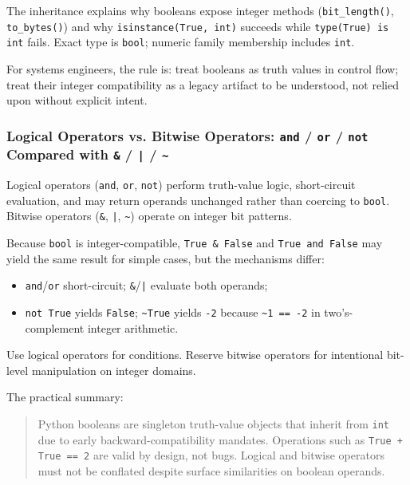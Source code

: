 The inheritance explains why booleans expose integer methods (\texttt{bit\_length()}, \texttt{to\_bytes()}) and why \texttt{isinstance(True, int)} succeeds while \texttt{type(True) is int} fails. Exact type is \texttt{bool}; numeric family membership includes \texttt{int}.

For systems engineers, the rule is: treat booleans as truth values in control flow; treat their integer compatibility as a legacy artifact to be understood, not relied upon without explicit intent.

\subsubsection{Logical Operators vs. Bitwise Operators: \texttt{and} / \texttt{or} / \texttt{not} Compared with \texttt{\&} / \texttt{|} / \texttt{\textasciitilde{}}}

Logical operators (\texttt{and}, \texttt{or}, \texttt{not}) perform truth-value logic, short-circuit evaluation, and may return operands unchanged rather than coercing to \texttt{bool}. Bitwise operators (\texttt{\&}, \texttt{|}, \texttt{\textasciitilde{}}) operate on integer bit patterns.

Because \texttt{bool} is integer-compatible, \texttt{True \& False} and \texttt{True and False} may yield the same result for simple cases, but the mechanisms differ:

\begin{itemize}
    \item \texttt{and}/\texttt{or} short-circuit; \texttt{\&}/\texttt{|} evaluate both operands;
    \item \texttt{not True} yields \texttt{False}; \texttt{\textasciitilde{}True} yields \texttt{-2} because \texttt{\textasciitilde{}1 == -2} in two's-complement integer arithmetic.
\end{itemize}

Use logical operators for conditions. Reserve bitwise operators for intentional bit-level manipulation on integer domains.

The practical summary:

\begin{quote}
Python booleans are singleton truth-value objects that inherit from \texttt{int} due to early backward-compatibility mandates. Operations such as \texttt{True + True == 2} are valid by design, not bugs. Logical and bitwise operators must not be conflated despite surface similarities on boolean operands.
\end{quote}
